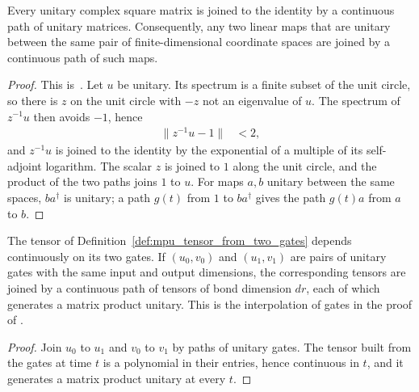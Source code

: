 \begin{lemma}
    \label{lem:unitary_matrices_joined}
    \leanok
    Every unitary complex square matrix is joined to the identity by a
    continuous path of unitary matrices. Consequently, any two linear maps
    that are unitary between the same pair of finite-dimensional coordinate
    spaces are joined by a continuous path of such maps.
\end{lemma}
\begin{proof}
    \leanok
    This is~\cite[``Paths of unitary matrices'']{QICLean2026Blueprint}.
    Let $u$ be unitary. Its spectrum is a finite subset of the unit circle,
    so there is $z$ on the unit circle with $-z$ not an eigenvalue of $u$.
    The spectrum of $z^{-1}u$ then avoids $-1$, hence
    \begin{align}
        \|z^{-1}u-1\| & <2,
    \end{align}
    and $z^{-1}u$ is joined to the identity by the exponential of a
    multiple of its self-adjoint logarithm. The scalar $z$ is joined to $1$
    along the unit circle, and the product of the two paths joins $1$ to
    $u$. For maps $a,b$ unitary between the same spaces, $ba^\dagger$ is
    unitary; a path $g(t)$ from $1$ to $ba^\dagger$ gives the path $g(t)a$
    from $a$ to $b$.
\end{proof}

\begin{lemma}
    \label{lem:mpu_tensor_from_gates_path}
    \leanok
    The tensor of Definition~\ref{def:mpu_tensor_from_two_gates} depends
    continuously on its two gates. If $(u_0,v_0)$ and $(u_1,v_1)$ are pairs
    of unitary gates with the same input and output dimensions, the
    corresponding tensors are joined by a continuous path of tensors of bond
    dimension $dr$, each of which generates a matrix product unitary. This is
    the interpolation of gates in the proof of
    \cite[Theorem~IV.6(iv)]{Cirac2017MPU}.
\end{lemma}
\begin{proof}
    \leanok
    Join $u_0$ to $u_1$ and $v_0$ to $v_1$ by paths of unitary gates. The
    tensor built from the gates at time $t$ is a polynomial in their entries,
    hence continuous in $t$, and it generates a matrix product unitary at
    every $t$.
\end{proof}

